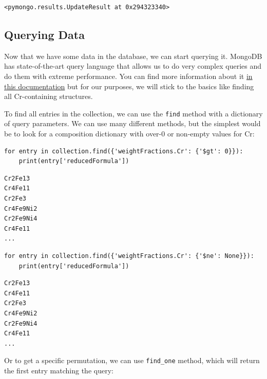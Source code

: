 \begin{verbatim}
<pymongo.results.UpdateResult at 0x294323340>
\end{verbatim}

\hypertarget{querying-data}{%
\subsection{Querying Data}\label{pysipfenntutorial:querying-data}}

Now that we have some data in the database, we can start querying it.
MongoDB has state-of-the-art query language that allows us to do very
complex queries and do them with extreme performance. You can find more
information about it
\href{https://www.mongodb.com/docs/manual/reference/method/db.collection.find/\#db.collection.find}{in
this documentation} but for our purposes, we will stick to the basics
like finding all Cr-containing structures.

To find all entries in the collection, we can use the
\texttt{find} method with a dictionary of query
parameters. We can use many different methods, but the simplest would be
to look for a composition dictionary with over-0 or non-empty values for
Cr:

\begin{verbatim}
for entry in collection.find({'weightFractions.Cr': {'$gt': 0}}):
    print(entry['reducedFormula'])
\end{verbatim}

\begin{verbatim}
Cr2Fe13
Cr4Fe11
Cr2Fe3
Cr4Fe9Ni2
Cr2Fe9Ni4
Cr4Fe11
...
\end{verbatim}

\begin{verbatim}
for entry in collection.find({'weightFractions.Cr': {'$ne': None}}):
    print(entry['reducedFormula'])
\end{verbatim}

\begin{verbatim}
Cr2Fe13
Cr4Fe11
Cr2Fe3
Cr4Fe9Ni2
Cr2Fe9Ni4
Cr4Fe11
...
\end{verbatim}

Or to get a specific permutation, we can use
\texttt{find\_one} method, which will return the first
entry matching the query:

